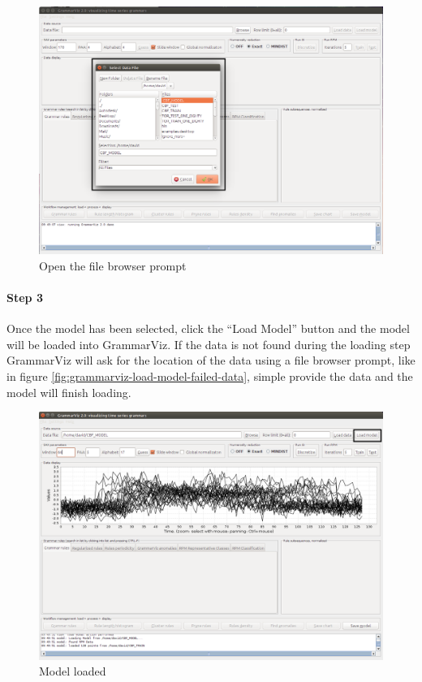 \documentclass[letterpaper, 12pt]{article}
\begin{document}
\begin{figure}[H]
  \includegraphics[width=\textwidth]{grammarviz-load-model-step-2}
  \caption{Open the file browser prompt}
  \label{fig:grammarviz-load-model-step-2}
\end{figure}

\newpage
\paragraph{Step 3}
Once the model has been selected, click the ``Load Model'' button and the model will be loaded into GrammarViz. If the data is not found during the loading step GrammarViz will ask for the location of the data using a file browser prompt, like in figure \ref{fig:grammarviz-load-model-failed-data}, simple provide the data and the model will finish loading. 

\begin{figure}[H]
  \includegraphics[width=\textwidth]{grammarviz-load-model-step-3}
  \caption{Model loaded}
  \label{fig:grammarviz-load-model-step-3}
\end{figure}
\end{document}

